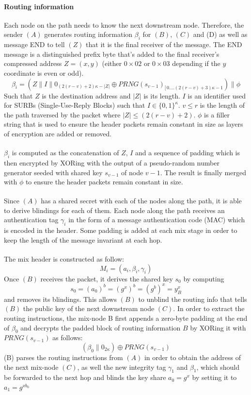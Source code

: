     \paragraph{Routing information}
    Each node on the path needs to know the next downstream node. Therefore, the sender $(A)$ generates routing information $\beta_i$ for $(B)$, $(C)$ and (D) as well as message END to tell $(Z)$ that it is the final receiver of the message. The END message is a distinguished prefix byte that's added to the final receiver's compressed address $Z=(x,y)$ (either $0\times02$ or $0\times03$ depending if the $y$ coordinate is even or odd).
    $$\beta_i=(Z\|I\|0_{(2(r-v)+2)\kappa-|Z|}\oplus PRNG(s_{v-1})_{[ \,0....(2(r-v)+3)\kappa-1})\|\phi$$
    Such that $Z$ is the destination address and $|Z|$ is its length. $I$ is an identifier used for SURBs (Single-Use-Reply Blocks) such that $I \in \{0, 1\}^\kappa$.
$v\leq r$ is the length of the path traversed by the packet where $|Z| \leq (2(r - v) + 2)$. $\phi$ is a filler string that is used to ensure the header packets remain constant in size as layers of encryption are added or removed.
    \\~\\$\beta_i$ is computed as the concatenation of $Z$, $I$ and a sequence of padding which is then encrypted by XORing with the output of a pseudo-random number generator seeded with shared key $s_{v-1}$ of node $v-1$. The result is finally merged with $\phi$ to ensure the header packets remain constant in size.
\\~\\Since $(A)$ has a shared secret with each of the nodes along the path, it is able to derive blindings for each of them.
\newline Each node along the path receives an authentication tag $\gamma_i$ in the form of a message authentication code (MAC)
which is encoded in the header.
\newline Some padding is added at each mix stage in order to keep the length of the message invariant at each hop.
\\~\\The mix header is constructed as follow: $$M_i=(a_i,\beta_i,\gamma_i)$$
\newline Once $(B)$ receives the packet, it derives the shared key $s_0$ by computing $$s_0=(a_0)^b=(g^x)^b=(g^b)^x=y^x_B$$ and removes its blindings. This allows $(B)$ to unblind the routing info that tells $(B)$ the public key of the next downstream node $(C)$. In order to extract the routing instructions, the mix-node B first appends a zero-byte padding at the end of $\beta_0$ and decrypts the padded block of routing information $B$ by XORing it with $PRNG(s_{v-1})$ as follows:
$$(\beta_0\|0_{2\kappa})\oplus PRNG(s_{v-1})$$
(B) parses the routing instructions from $(A)$ in order to obtain the address of the next mix-node $(C)$, as well the new integrity tag $\gamma_1$ and $\beta_1$, which should be forwarded to the next hop and blinds the key share $a_0=g^x$ by setting it to $a_1=g^{xb_0}$
